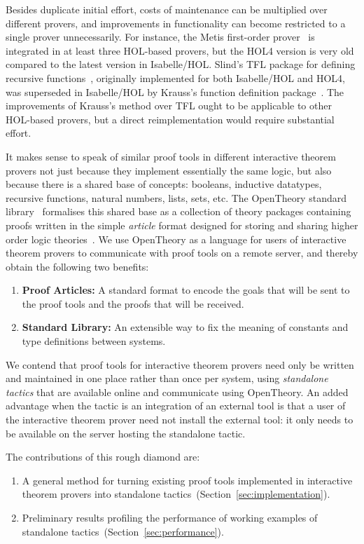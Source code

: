 \documentclass{llncs}
\newcommand{\OpenTheory}{OpenTheory\xspace}
\newcommand{\secref}[1]{Section~\ref{sec:#1}}
\begin{document}
Besides duplicate initial effort, costs of maintenance can be multiplied over different provers, and improvements in functionality can become restricted to a single prover unnecessarily.
For instance, the Metis first-order prover~\cite{hurd2003d} is integrated in at least three HOL-based provers, but the HOL4 version is very old compared to the latest version in Isabelle/HOL.
Slind's TFL package for defining recursive functions~\cite{slindphd}, originally implemented for both Isabelle/HOL and HOL4, was superseded in Isabelle/HOL by Krauss's function definition package~\cite{DBLP:journals/jar/Krauss10}.
The improvements of Krauss's method over TFL ought to be applicable to other HOL-based provers, but a direct reimplementation would require substantial effort.

It makes sense to speak of similar proof tools in different interactive theorem provers not just because they implement essentially the same logic, but also because there is a shared base of concepts: booleans, inductive datatypes, recursive functions, natural numbers, lists, sets, etc.
The \OpenTheory standard library~\cite{hurd2011} formalises this shared base as a collection of theory packages containing proofs written in the simple \emph{article} format designed for storing and sharing higher order logic theories~\cite{hurd2009}.
We use \OpenTheory as a language for users of interactive theorem provers to communicate with proof tools on a remote server, and thereby obtain the following two benefits:
\begin{enumerate}
\item\textbf{Proof Articles:} A standard format to encode the goals that will be sent to the proof tools and the proofs that will be received.

\item\textbf{Standard Library:} An extensible way to fix the meaning of constants and type definitions between systems.
\end{enumerate}

We contend that proof tools for interactive theorem provers need only be written and maintained in one place rather than once per system, using \emph{standalone tactics} that are available online and communicate using \OpenTheory.
An added advantage when the tactic is an integration of an external tool is that a user of the interactive theorem prover need not install the external tool: it only needs to be available on the server hosting the standalone tactic.

The contributions of this rough diamond are:
\begin{enumerate}
\item A general method for turning existing proof tools implemented in interactive theorem provers into standalone tactics~(\secref{implementation}).

\item Preliminary results profiling the performance of working examples of standalone tactics~(\secref{performance}).
\end{enumerate}
\end{document}
